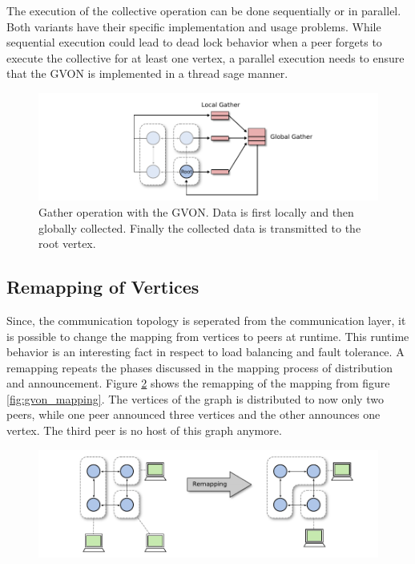 The execution of the collective operation can be done sequentially or in
parallel. Both variants have their specific implementation and usage
problems. While sequential execution could lead to dead lock behavior
when a peer forgets to execute the collective for at least one vertex,
a parallel execution needs to ensure that the GVON is implemented in
a thread sage manner.

\begin{figure}[H]
  \centering \includegraphics[width=\textwidth]{graphics/30_gvon_collective}
  \caption{Gather operation with the GVON. Data is first locally 
    and then globally collected. Finally the collected data
    is transmitted to the root vertex.}
  \label{fig:gvon_collective}
\end{figure}


\subsection{Remapping of Vertices}
\label{sec:remapping}
Since, the communication topology is seperated from the communication
layer, it is possible to change the mapping from vertices to peers at
runtime. This runtime behavior is an interesting fact in respect to
load balancing and fault tolerance. A remapping repeats the phases
discussed in the mapping process of distribution and announcement.
Figure \ref{fig:gvon_remapping} shows the remapping of the mapping
from figure \ref{fig:gvon_mapping}. The vertices of the graph is
distributed to now only two peers, while one peer announced three
vertices and the other announces one vertex. The third peer is no
host of this graph anymore.

\begin{figure}[H]
  \centering \includegraphics[width=\textwidth]{graphics/30_gvon_remapping}
  \caption{}
  \label{fig:gvon_remapping}
\end{figure}


